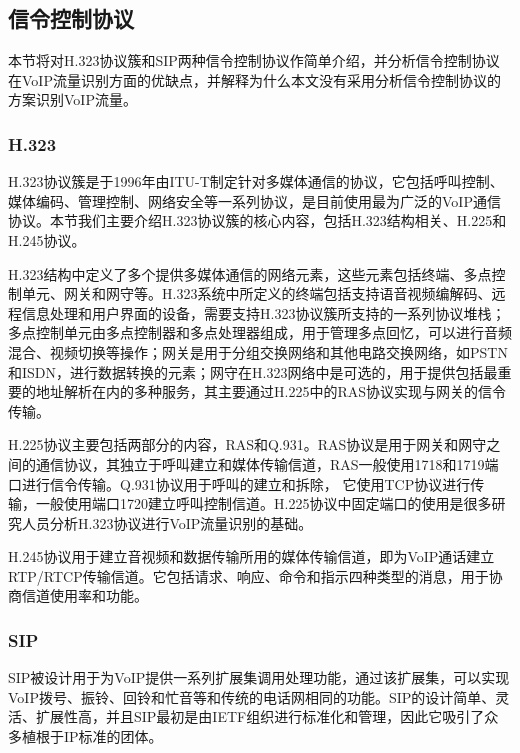 \subsection{信令控制协议}
本节将对H.323协议簇和SIP两种信令控制协议作简单介绍，并分析信令控制协议在VoIP流量识别方面的优缺点，并解释为什么本文没有采用分析信令控制协议的方案识别VoIP流量。
\subsubsection{H.323}
H.323协议簇是于1996年由ITU-T制定针对多媒体通信的协议，它包括呼叫控制、媒体编码、管理控制、网络安全等一系列协议，是目前使用最为广泛的VoIP通信协议。本节我们主要介绍H.323协议簇的核心内容，包括H.323结构相关、H.225和H.245协议。

H.323结构中定义了多个提供多媒体通信的网络元素，这些元素包括终端、多点控制单元、网关和网守等。H.323系统中所定义的终端包括支持语音视频编解码、远程信息处理和用户界面的设备，需要支持H.323协议簇所支持的一系列协议堆栈；多点控制单元由多点控制器和多点处理器组成，用于管理多点回忆，可以进行音频混合、视频切换等操作；网关是用于分组交换网络和其他电路交换网络，如PSTN和ISDN，进行数据转换的元素；网守在H.323网络中是可选的，用于提供包括最重要的地址解析在内的多种服务，其主要通过H.225中的RAS协议实现与网关的信令传输。

H.225协议主要包括两部分的内容，RAS和Q.931。RAS协议是用于网关和网守之间的通信协议，其独立于呼叫建立和媒体传输信道，RAS一般使用1718和1719端口进行信令传输。Q.931协议用于呼叫的建立和拆除， 它使用TCP协议进行传输，一般使用端口1720建立呼叫控制信道。H.225协议中固定端口的使用是很多研究人员分析H.323协议进行VoIP流量识别的基础。

H.245协议用于建立音视频和数据传输所用的媒体传输信道，即为VoIP通话建立RTP/RTCP传输信道。它包括请求、响应、命令和指示四种类型的消息，用于协商信道使用率和功能。


\subsubsection{SIP}
SIP被设计用于为VoIP提供一系列扩展集调用处理功能，通过该扩展集，可以实现VoIP拨号、振铃、回铃和忙音等和传统的电话网相同的功能。SIP的设计简单、灵活、扩展性高，并且SIP最初是由IETF组织进行标准化和管理，因此它吸引了众多植根于IP标准的团体。

